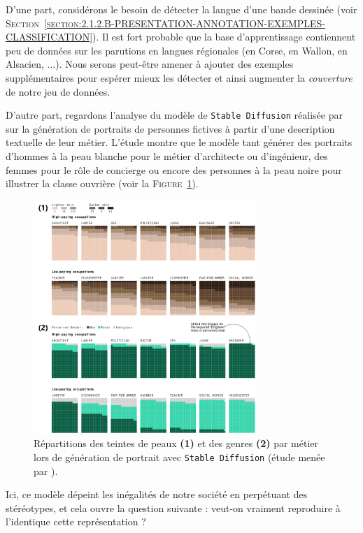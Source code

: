 			\begin{leftBarExamples}
				D'une part, considérons le besoin de détecter la langue d'une bande dessinée (voir \textsc{Section~\ref{section:2.1.2.B-PRESENTATION-ANNOTATION-EXEMPLES-CLASSIFICATION}}).
				Il est fort probable que la base d'apprentissage contiennent peu de données sur les parutions en langues régionales (en Corse, en Wallon, en Alsacien, ...).
				Nous serons peut-être amener à ajouter des exemples supplémentaires pour espérer mieux les détecter et ainsi augmenter la \textit{couverture} de notre jeu de données.
				
				D'autre part, regardons l'analyse du modèle de \texttt{Stable Diffusion} réalisée par \cite{nicoletti-bass:2023:generative-ai-takes} sur la génération de portraits de personnes fictives à partir d'une description textuelle de leur métier.
				L'étude montre que le modèle tant générer des portraits d'hommes à la peau blanche pour le métier d'architecte ou d'ingénieur, des femmes pour le rôle de concierge ou encore des personnes à la peau noire pour illustrer la classe ouvrière (voir la \textsc{Figure~\ref{figure:2.3.1.A-DEFIS-ANNOTATION-ASPECT-DONNEES-REPRESENTATIVITE-STEREOTYPES}}).
				\begin{figure}[H]
					\centering
					\includegraphics[width=0.75\textwidth]{figures/etatdelart-nicoletti-bass-2023}
					\caption{
						Répartitions des teintes de peaux \textbf{(1)} et des genres \textbf{(2)} par métier lors de génération de portrait avec \texttt{Stable Diffusion} (étude menée par \cite{nicoletti-bass:2023:generative-ai-takes}).
					}
					\label{figure:2.3.1.A-DEFIS-ANNOTATION-ASPECT-DONNEES-REPRESENTATIVITE-STEREOTYPES}
				\end{figure}
				Ici, ce modèle dépeint les inégalités de notre société en perpétuant des stéréotypes, et cela ouvre la question suivante : veut-on vraiment reproduire à l'identique cette représentation ?
			\end{leftBarExamples}
